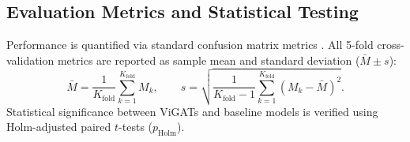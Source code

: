 \documentclass[]{interact}
\theoremstyle{plain}
\theoremstyle{definition}
\theoremstyle{remark}
\begin{document}
{\subsection{Evaluation Metrics and Statistical Testing}
\label{subsec:evaluation_metrics}

Performance is quantified via standard confusion matrix metrics \citep{sokolova2009systematic}. All 5-fold cross-validation metrics are reported as sample mean and standard deviation ($\bar{M} \pm s$):
\begin{equation}
\bar{M} = \frac{1}{K_{\mathrm{fold}}} \sum_{k=1}^{K_{\mathrm{fold}}} M_k, \qquad
s = \sqrt{\frac{1}{K_{\mathrm{fold}} - 1} \sum_{k=1}^{K_{\mathrm{fold}}} (M_k - \bar{M})^2}.
\end{equation}
Statistical significance between ViGATs and baseline models is verified using Holm-adjusted paired $t$-tests ($p_{\mathrm{Holm}}$).


}
\end{document}
